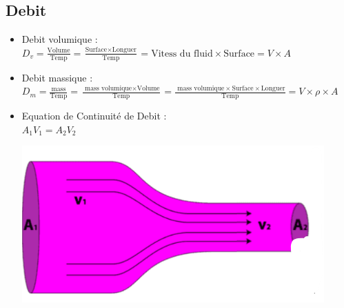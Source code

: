 \documentclass[12pt,oneside]{book}
\begin{document}
\subsection{Debit}
\begin{itemize}
	\item Debit volumique : \\
	$ D_v = \frac{\text{Volume}}{\text{Temp}} = \frac{\text{Surface} \times \text{Longuer}}{\text{Temp}} = \text{Vitess du fluid} \times \text{Surface} = V\times A  $
	\item Debit massique :\\
	 $ D_m = \frac{\text{mass}}{\text{Temp}} = \frac{\text{ mass volumique} \times \text{Volume}}{\text{Temp}} = \frac{\text{ mass volumique} \times \text{Surface} \times \text{Longuer}}{\text{Temp}} = V\times \rho \times A $
	\item
	      \begin{minipage}{0.5\linewidth}
		      Equation de Continuité de Debit :\\
			   $A_1V_1=A_2V_2 $
	      \end{minipage}
	      \begin{minipage}{0.5\linewidth}
		      \includegraphics[width=\linewidth]{../pic/1103/2.png}
	      \end{minipage}
\end{itemize}
\end{document}
